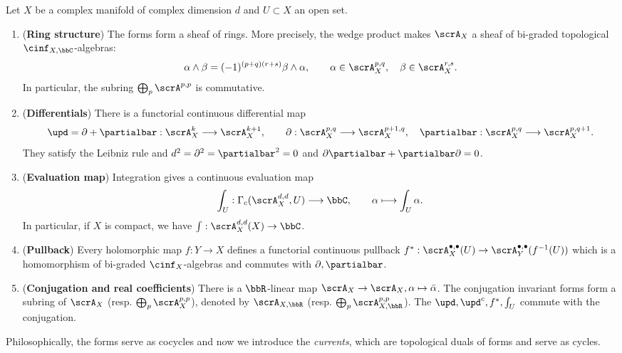 \begin{proposition}[label=\labelNFM{prop:basic-properties-of-forms-with-topology}, status=draft, tag=0000000]
	Let $X$ be a complex manifold of complex dimension $d$ and $U \subset X$ an open set.

	\begin{enumerate}
		\item (\textbf{Ring structure}) The forms form a sheaf of rings.
		      More precisely, the wedge product makes $\scrA_X$ a sheaf of bi-graded topological $\cinf_{X,\bbC}$-algebras:
		      \[
			      \alpha \wedge \beta = (-1)^{(p+q)(r+s)}\beta \wedge \alpha,
			      \qquad \alpha \in \scrA_X^{p,q},\quad\beta \in \scrA_X^{r,s}.
		      \]
		      In particular, the subring $\bigoplus_p\scrA^{p,p}$ is commutative.
		\item (\textbf{Differentials}) There is a functorial continuous differential map
		      \[
			      \upd = \partial+\partialbar:\scrA_X^k \longrightarrow \scrA_X^{k+1},
			      \qquad
			      \partial : \scrA_X^{p,q} \longrightarrow \scrA_X^{p+1,q},\quad
			      \partialbar : \scrA_X^{p,q} \longrightarrow \scrA_X^{p,q+1}.
		      \]
		      They satisfy the Leibniz rule and $d^2 = \partial^2 = \partialbar^2 = 0$ and
		      $\partial\partialbar+\partialbar\partial = 0$.
		\item (\textbf{Evaluation map}) Integration gives a continuous evaluation map
		      \[
			      \int_U:\Gamma_c(\scrA_X^{d,d},U) \longrightarrow \bbC,
			      \qquad \alpha\longmapsto\int_U\alpha.
		      \]
		      In particular, if $X$ is compact, we have $\int: \scrA^{d,d}_X(X) \to \bbC$.
		\item (\textbf{Pullback}) Every holomorphic map $f:Y \to X$ defines a functorial continuous pullback $f^*: \scrA_X^{\bullet,\bullet}(U) \to \scrA_Y^{\bullet,\bullet}(f^{-1}(U))$ which is a homomorphism of bi-graded $\cinf_X$-algebras and commutes with $\partial,\partialbar$.
		\item (\textbf{Conjugation and real coefficients}) There is a $\bbR$-linear map $\scrA_X \to \scrA_X, \alpha \mapsto \bar{\alpha}$.
		      The conjugation invariant forms form a subring of $\scrA_X$ (resp. $\bigoplus_p \scrA_X^{p,p}$), denoted by $\scrA_{X,\bbR}$ (resp. $\bigoplus_p \scrA_{X,\bbR}^{p,p}$).
		      The $\upd,\upd^c,f^*,\int_U$ commute with the conjugation.
	\end{enumerate}
\end{proposition}

Philosophically, the forms serve as cocycles and now we introduce the \emph{currents}, which are topological duals of forms and serve as cycles.

